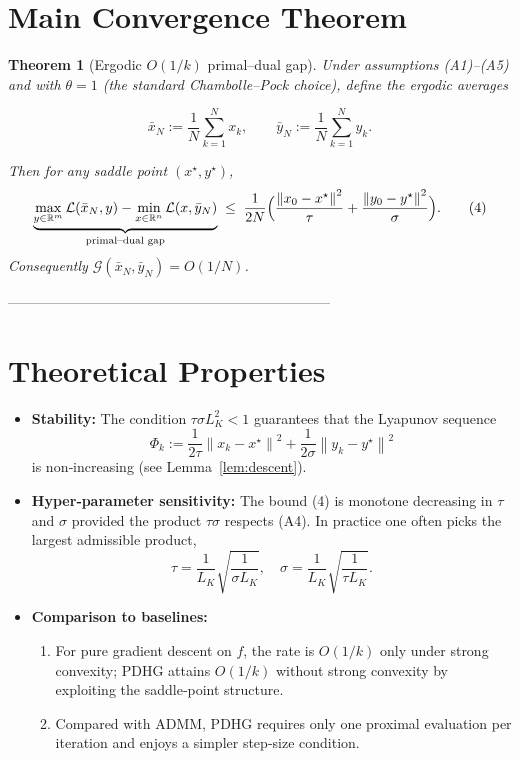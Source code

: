 \documentclass{article}
\newtheorem{theorem}{Theorem}
\newcommand{\norm}[1]{\left\lVert#1\right\rVert}
\begin{document}
\section*{Main Convergence Theorem}
\begin{theorem}[Ergodic $O(1/k)$ primal–dual gap]\label{thm:main}
Under assumptions (A1)–(A5) and with $\theta=1$ (the standard Chambolle–Pock choice), define the ergodic averages  

\[
\bar x_{N}:=\frac{1}{N}\sum_{k=1}^{N}x_{k},
\qquad
\bar y_{N}:=\frac{1}{N}\sum_{k=1}^{N}y_{k}.
\]

Then for any saddle point $(x^{\star},y^{\star})$,
\[
\underbrace{\max_{y\in\mathbb R^{m}}\mathcal L(\bar x_{N},y)-\min_{x\in\mathbb R^{n}}\mathcal L(x,\bar y_{N})}_{\text{primal–dual gap}}
\;\le\;
\frac{1}{2N}\Bigl(\frac{\norm{x_{0}-x^{\star}}^{2}}{\tau}
      +\frac{\norm{y_{0}-y^{\star}}^{2}}{\sigma}\Bigr).
\tag{4}
\]
Consequently $\mathcal G(\bar x_{N},\bar y_{N})=O(1/N)$.
\end{theorem}

---------------------------------------------------------------------

\section*{Theoretical Properties}
\begin{itemize}[nosep]
\item \textbf{Stability:} The condition $\tau\sigma L_{K}^{2}<1$ guarantees that the Lyapunov sequence 
\[
\Phi_{k}:=\frac{1}{2\tau}\norm{x_{k}-x^{\star}}^{2}
          +\frac{1}{2\sigma}\norm{y_{k}-y^{\star}}^{2}
\]
is non‑increasing (see Lemma~\ref{lem:descent}).
\item \textbf{Hyper‑parameter sensitivity:} The bound (4) is monotone decreasing in $\tau$ and $\sigma$ provided the product $\tau\sigma$ respects (A4). In practice one often picks the largest admissible product,
\[
\tau=\frac{1}{L_{K}}\sqrt{\frac{1}{\sigma L_{K}}},\quad
\sigma=\frac{1}{L_{K}}\sqrt{\frac{1}{\tau L_{K}}}.
\]
\item \textbf{Comparison to baselines:}
    \begin{enumerate}
        \item For pure gradient descent on $f$, the rate is $O(1/k)$ only under strong convexity; PDHG attains $O(1/k)$ without strong convexity by exploiting the saddle‑point structure.
        \item Compared with ADMM, PDHG requires only one proximal evaluation per iteration and enjoys a simpler step‑size condition.
    \end{enumerate}
\end{itemize}
\end{document}
